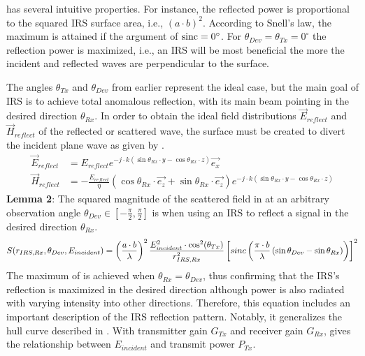  has several intuitive properties. For instance, the reflected power is proportional to the squared IRS surface area, i.e., $(a \cdot b)^2$. According to Snell's law, the maximum is attained if the argument of $\operatorname{sinc}=0^\circ$. For $\theta_{Dev} =\theta_{Tx}=0^\circ$ the reflection power is maximized, i.e., an IRS will be most beneficial the more the incident and reflected waves are perpendicular to the surface.

The angles $\theta_{Tx}$ and $\theta_{Dev}$ from earlier represent the ideal case, but the main goal of \ac{IRS} is to achieve total anomalous reflection, with its main beam pointing in the desired direction $\theta_{Rx}$. In order to obtain the ideal field distributions  $\overrightarrow{E}_{reflect}$ and $\overrightarrow{H}_{reflect}$ of the reflected or scattered wave, the surface must be created to divert the incident plane wave as given by  .
\begin{equation} \label{Eq:model1 reflect EM}
	\begin{aligned}
		\overrightarrow{E}_{reflect} &= E_{reflect} e^{-j \cdot k \left( \sin{\theta_{Rx}} \cdot y - \cos{\theta_{Rx}} \cdot z \right) } {\overrightarrow{e_x}}  \\
		\overrightarrow{H}_{reflect} &= - \frac{E_{reflect}}{\eta} \left( \cos{\theta_{Rx}} \cdot {\overrightarrow{e_z}} +\sin{\theta_{Rx}} \cdot {\overrightarrow{e_z}} \right) e^{-j \cdot k \left( \sin{\theta_{Rx}} \cdot y - \cos{\theta_{Rx}} \cdot z \right) }
	\end{aligned}
\end{equation}
\textbf{Lemma 2}: The squared magnitude of the scattered field in  at an arbitrary observation angle $\theta_{Dev} \in [-\frac{\pi}{2}, \frac{\pi}{2}]$ is when using an \ac{IRS} to reflect a signal in the desired direction $\theta_{Rx}$.
\begin{equation} \label{Eq:model1 squared magnitude of the scattered field}
	S(r_{IRS, Rx},\theta_{Dev},E_{incident}) = \left( \frac{a \cdot b}{\lambda} \right)^2 \frac{E_{incident}^2  \cdot \cos^2 (\theta_{Tx})}{r_{IRS, Rx}^2}  \left[ \\sinc \left( \frac{\pi \cdot b}{\lambda} \left(\sin\theta_{Dev}-\sin\theta_{Rx} \right) \right) \right]^2
\end{equation}
The maximum of   is achieved when $\theta_{Rx}=\theta_{Dev} $, thus confirming that the IRS's reflection is maximized in the desired direction although power is also radiated with varying intensity into other directions. Therefore, this equation includes an important description of the IRS reflection pattern. Notably, it generalizes the hull curve described in . With transmitter gain $G_{Tx}$ and receiver gain $G_{Rx}$,  gives the relationship between $E_{incident}$ and transmit power $P_{Tx}$.
